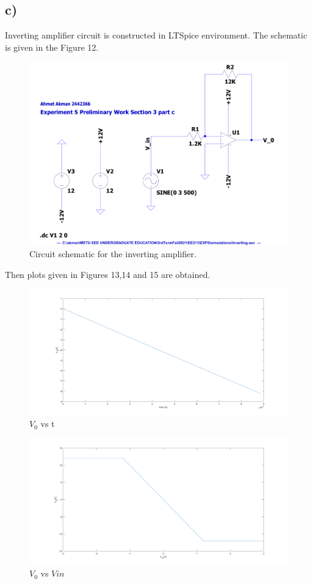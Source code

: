 \documentclass[letterpaper,12pt]{article}
\begin{document}
\subsection{c)}
Inverting amplifier circuit is constructed in LTSpice environment. The schematic is given in the Figure 12.
\begin{figure}[H]
	\centering
   \includegraphics[width=1\textwidth]{Inverting_SCH.pdf}
   \caption{Circuit schematic for the inverting amplifier.}
\end{figure} 
Then plots given in Figures 13,14 and 15 are obtained.
\begin{figure}[H]
	\centering
   \includegraphics[width=1\textwidth]{3c_vs_t.png}
   \caption{\(V_0\) vs t}
\end{figure}

\begin{figure}[H]
	\centering
   \includegraphics[width=1\textwidth]{3c_vs_vin.png}
   \caption{\(V_0\) vs \(V{in}\)}
\end{figure}
\end{document}
